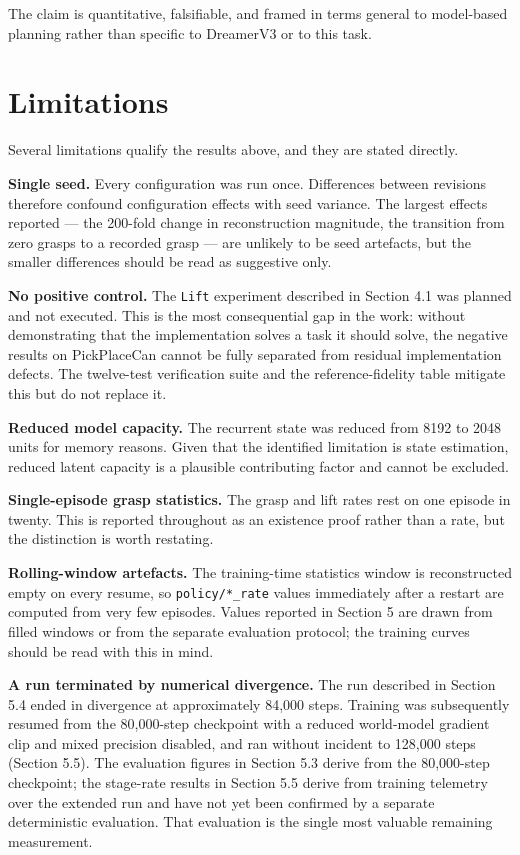 \documentclass[12pt,a4paper,oneside]{report}
\begin{document}
The claim is quantitative, falsifiable, and framed in terms general to
model-based planning rather than specific to DreamerV3 or to this task.

\hypertarget{limitations}{%
\section{Limitations}\label{limitations}}

Several limitations qualify the results above, and they are stated directly.

\textbf{Single seed.} Every configuration was run once. Differences between revisions
therefore confound configuration effects with seed variance. The largest effects
reported --- the 200-fold change in reconstruction magnitude, the transition from
zero grasps to a recorded grasp --- are unlikely to be seed artefacts, but the
smaller differences should be read as suggestive only.

\textbf{No positive control.} The \texttt{Lift} experiment described in Section 4.1 was
planned and not executed. This is the most consequential gap in the work: without
demonstrating that the implementation solves a task it should solve, the negative
results on PickPlaceCan cannot be fully separated from residual implementation
defects. The twelve-test verification suite and the reference-fidelity table
mitigate this but do not replace it.

\textbf{Reduced model capacity.} The recurrent state was reduced from 8192 to 2048
units for memory reasons. Given that the identified limitation is state
estimation, reduced latent capacity is a plausible contributing factor and cannot
be excluded.

\textbf{Single-episode grasp statistics.} The grasp and lift rates rest on one episode
in twenty. This is reported throughout as an existence proof rather than a rate,
but the distinction is worth restating.

\textbf{Rolling-window artefacts.} The training-time statistics window is reconstructed
empty on every resume, so \texttt{policy/*\_rate} values immediately after a restart are
computed from very few episodes. Values reported in Section 5 are drawn from
filled windows or from the separate evaluation protocol; the training curves
should be read with this in mind.

\textbf{A run terminated by numerical divergence.} The run described in Section 5.4
ended in divergence at approximately 84,000 steps. Training was subsequently
resumed from the 80,000-step checkpoint with a reduced world-model gradient clip
and mixed precision disabled, and ran without incident to 128,000 steps
(Section 5.5). The evaluation figures in Section 5.3 derive from the
80,000-step checkpoint; the stage-rate results in Section 5.5 derive from
training telemetry over the extended run and have not yet been confirmed by a
separate deterministic evaluation. That evaluation is the single most valuable
remaining measurement.
\end{document}
